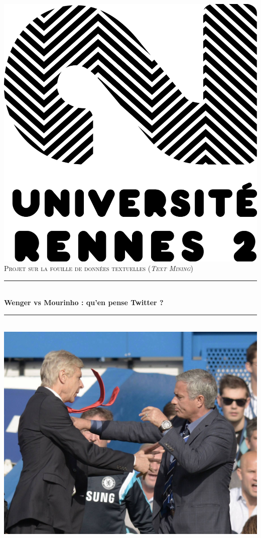 \documentclass[14pt, openany]{article}
\newcommand{\HRule}{\rule{\linewidth}{0.5mm}}
\begin{document}
\begin{titlepage}
\begin{center}
\includegraphics[scale=0.15]{Images/ur2.png}\\
\bigskip
\textsc{\Large Projet sur la fouille de données textuelles (\textit{Text Mining})}\\
    \HRule \\[0.4cm]
    { \huge \bfseries Wenger vs Mourinho : qu'en pense Twitter ?\\[0.4cm] }
        \HRule \\[2cm]
    \includegraphics[scale=0.8]{Images/fight.jpg}

\end{center}
\end{titlepage}
\end{document}
